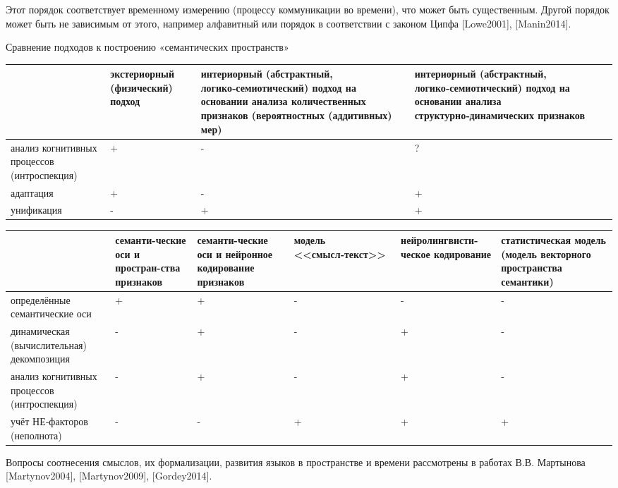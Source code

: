 Этот порядок соответствует временному измерению (процессу коммуникации во времени), что может быть существенным. Другой порядок может быть не зависимым от этого, например алфавитный или порядок в соответствии с законом Ципфа [Lowe2001], [Manin2014]. 

Сравнение подходов к построению «семантических пространств»

\begin{tabular}{|>{\centering\arraybackslash}m{3cm}|>{\centering\arraybackslash}m{3cm}|>{\centering\arraybackslash}m{5cm}|>{\centering\arraybackslash}m{5cm}|}
	\hline
	& экстериорный (физический) подход
	& интериорный (абстрактный, логико‑семиотический) подход на основании анализа количественных признаков (вероятностных (аддитивных) мер)
	& интериорный (абстрактный, логико‑семиотический) подход на основании анализа структурно‑динамических признаков
	\\
\hline
	анализ когнитивных процессов (интроспекция)
	& +
	& -
	& ?
	\\
\hline
	адаптация
	& +
	& -
	& +
	\\
\hline
	унификация
	& -
	& +
	& +
	\\
\hline
\end{tabular}

\begin{tabular}{|>{\centering\arraybackslash}m{3cm}|>{\centering\arraybackslash}m{2cm}|>{\centering\arraybackslash}m{2cm}|>{\centering\arraybackslash}m{3cm}|>{\centering\arraybackslash}m{3cm}|>{\centering\arraybackslash}m{3cm}|}
	\hline
	& семанти-ческие оси и простран-ства признаков
	& семанти-ческие оси и нейронное кодирование признаков
	& модель <<смысл‑текст>>
	& нейролингвисти-ческое кодирование
	& статистическая модель (модель векторного пространства семантики)
\\
	\hline
	определённые семантические оси
	& +
	& +
	& -
	& -
	& -
	\\
	\hline
	динамическая (вычислительная) декомпозиция
	& -
	& +
	& -
	& +
	& -
	\\
	\hline
анализ когнитивных процессов (интроспекция)
 & -
 & +
 & -
 & +
 & -
 \\
	\hline
учёт НЕ‑факторов (неполнота)
 & -
 & -
 & +
 & +
 & +
 \\
	\hline
\end{tabular}


Вопросы соотнесения смыслов, их формализации, развития языков в пространстве и времени рассмотрены в работах В.В. Мартынова [Martynov2004], [Martynov2009], [Gordey2014].

